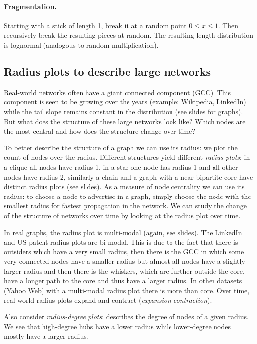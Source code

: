 \paragraph{Fragmentation.}
Starting with a stick of length 1, break it at a random point $0 \leq x \leq 1$. Then recursively break the resulting pieces at random. The resulting length distribution is lognormal (analogous to random multiplication).

\subsection{Radius plots to describe large networks}
\bigskip

Real-world networks often have a giant connected component (GCC). This component is seen to be growing over the years (example: Wikipedia, LinkedIn) while the tail slope remains constant in the distribution (see slides for graphs). But what does the structure of these large networks look like? Which nodes are the most central and how does the structure change over time?

To better describe the structure of a graph we can use its radius: we plot the count of nodes over the radius. Different structures yield different \emph{radius plots}: in a clique all nodes have radius 1, in a star one node has radius 1 and all other nodes have radius 2, similarly a chain and a graph with a near-bipartite core have distinct radius plots (see slides). As a measure of node centrality we can use its radius: to choose a node to advertise in a graph, simply choose the node with the smallest radius for fastest propagation in the network. We can study the change of the structure of networks over time by looking at the radius plot over time.

In real graphs, the radius plot is multi-modal (again, see slides). The LinkedIn and US patent radius plots are bi-modal. This is due to the fact that there is outsiders which have a very small radius, then there is the GCC in which some very-connected nodes have a smaller radius but almost all nodes have a slightly larger radius and then there is the whiskers, which are further outside the core, have a longer path to the core and thus have a larger radius. In other datasets (Yahoo Web) with a multi-modal radius plot there is more than core. Over time, real-world radius plots expand and contract (\emph{expansion-contraction}).

Also consider \emph{radius-degree plots}: describes the degree of nodes of a given radius. We see that high-degree hubs have a lower radius while lower-degree nodes mostly have a larger radius.